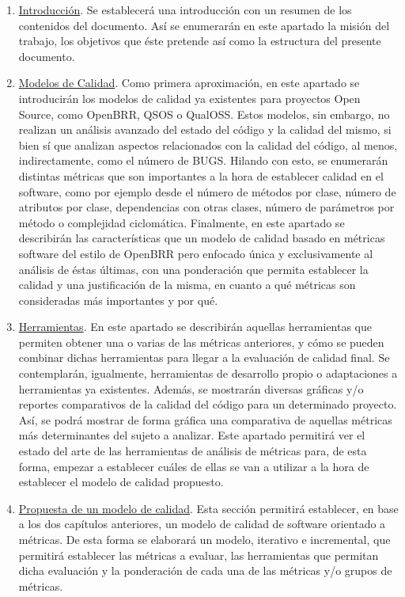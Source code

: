 \documentclass[11pt]{article}
\begin{document}
\begin{enumerate}
\item{\underline{Introducción}}. Se establecerá una introducción con un resumen de los contenidos del documento. Así se enumerarán en este apartado la misión del trabajo, los objetivos que éste pretende así como la estructura del presente documento.
\item{\underline{Modelos de Calidad}}. Como primera aproximación, en este apartado se introducirán los modelos de calidad ya existentes para proyectos Open Source, como OpenBRR, QSOS o QualOSS. Estos modelos, sin embargo, no realizan un análisis avanzado del estado del código y la calidad del mismo, si bien sí que analizan aspectos relacionados con la calidad del código, al menos, indirectamente, como el número de BUGS.
Hilando con esto, se enumerarán distintas métricas que son importantes a la hora de establecer calidad en el software, como por ejemplo desde el número de métodos por clase, número de atributos por clase, dependencias con otras clases, número de parámetros por método o complejidad ciclomática.
Finalmente, en este apartado se describirán las características que un modelo de calidad basado en métricas software del estilo de OpenBRR pero enfocado única y exclusivamente al análisis de éstas últimas, con una ponderación que permita establecer la calidad y una justificación de la misma, en cuanto a qué métricas son consideradas más importantes y por qué.
\item{\underline{Herramientas}}. En este apartado se describirán aquellas herramientas que permiten obtener una o varias de las métricas anteriores, y cómo se pueden combinar dichas herramientas para llegar a la evaluación de calidad final. Se contemplarán, igualmente, herramientas de desarrollo propio o adaptaciones a herramientas ya existentes. 
Además, se mostrarán diversas gráficas y/o reportes comparativos de la calidad del código para un determinado proyecto. Así, se podrá mostrar de forma gráfica una comparativa de aquellas métricas más determinantes del sujeto a analizar.
Este apartado permitirá ver el estado del arte de las herramientas de análisis de métricas para, de esta forma, empezar a establecer cuáles de ellas se van a utilizar a la hora de establecer el modelo de calidad propuesto.
\item{\underline{Propuesta de un modelo de calidad}}. Esta sección permitirá establecer, en base a los dos capítulos anteriores, un modelo de calidad de software orientado a métricas. De esta forma se elaborará un modelo, iterativo e incremental, que permitirá establecer las métricas a evaluar, las herramientas que permitan dicha evaluación y la ponderación de cada una de las métricas y/o grupos de métricas.

\end{enumerate}
\end{document}
